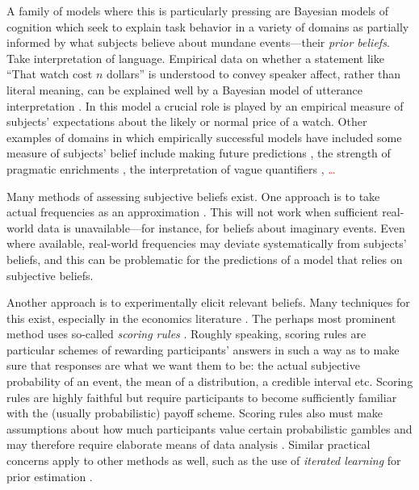 \documentclass[10pt,letterpaper]{article}
\newcommand{\citep}[1]{\cite{#1}}
\begin{document}
A family of models where this is particularly pressing are Bayesian models of cognition which
seek to explain task behavior in a variety of domains as partially informed by what subjects
believe about mundane events---their \emph{prior beliefs}. Take interpretation of language. Empirical data on whether a
statement like ``That watch cost $n$ dollars'' is understood to convey speaker affect, rather
than literal meaning, can be explained well by a Bayesian model of utterance interpretation
\citep{KaoWu2014:Nonliteral-Unde}. In this model a crucial role is played by
an empirical measure of subjects' expectations about the likely or normal price of a
watch. 
Other examples of domains in which empirically successful models have included some
measure of subjects' belief include making future predictions
\citep{GriffithsTenenbaum2006:Optimal-Predict}, the strength of pragmatic enrichments
\citep{DegenTessler2015:Wonky-worlds:-L}, the interpretation of vague quantifiers
\citep{SchollerFranke2015:Semantic-values}, \textcolor{red}{ \dots }


Many methods of assessing subjective beliefs exist. One approach is to take actual frequencies
as an approximation \citep{GriffithsTenenbaum2006:Optimal-Predict}. This will not
work when sufficient real-world data is unavailable---for instance, for beliefs about imaginary events. 
Even where available, real-world
frequencies may deviate systematically from subjects' beliefs, and this can be problematic for
the predictions of a model that relies on subjective beliefs.

Another approach is to experimentally elicit relevant beliefs. Many techniques for this
exist, especially in the economics literature
\citep{MorganHenrion1990:Uncertainty:-A-,Manski2004:Measuring-Expec,SchlagTremewan2014:A-penny-for-you,AndersenFountain2014:Estimating-Subj}. The
perhaps most prominent method uses so-called \emph{scoring rules}
\citep{Savage1971:Elicitation-of-,SchlagTremewan2014:A-penny-for-you}. Roughly speaking,
scoring rules are particular schemes of rewarding participants' answers in such a way as to
make sure that responses are what we want them to be: the actual subjective probability of an
event, the mean of a distribution, a credible interval etc. Scoring rules are highly faithful
but require participants to become sufficiently familiar with the (usually probabilistic)
payoff scheme. Scoring rules also must make assumptions about how much participants value
certain probabilistic gambles and may therefore require elaborate means of data analysis
\citep{AndersenFountain2014:Estimating-Subj}. Similar practical concerns apply to other methods
as well, such as the use of \emph{iterated learning} for prior estimation
\citep{LewandowskyGriffiths2009:The-Wisdom-of-I}.
\end{document}
